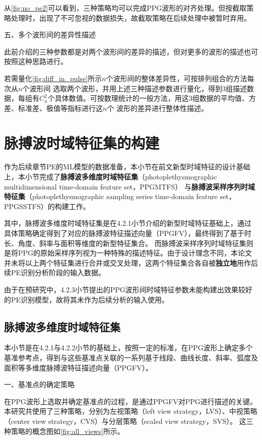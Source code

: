 从\autoref{fig:no_pe2}可以看到，三种策略均可以完成PPG波形的对齐处理。但按截取策略处理时，出现了不可忽视的数据损失，故截取策略在后续处理中被暂时弃用。

五、多个波形间的差异性描述

此前介绍的三种参数都是对两个波形间的差异的描述，但对更多的波形的描述也可按照这种思路进行。

若需量化\autoref{fig:diff_in_pulse}所示$n$个波形间的整体差异性，可按排列组合的方法每次从$n$个波形间
选取两个波形，并用上述三种描述参数进行量化，得到3组描述数据，每组有$C_n^2$个具体数值。可按数理统计的一般方法，用这3组数据的平均值、方差、标准差、极值等指标进行这$n$个
波形的差异进行整体性描述。

\section{脉搏波时域特征集的构建}
作为后续章节PE的ML模型的数据准备，本小节在前文新型时域特征的设计基础上，本小节完成了\textbf{脉搏波多维度时域特征集}（photoplethysmographic multidimensional time-domain feature set，PPGMTFS）
与\textbf{脉搏波采样序列时域特征集}（photoplethysmographic sampling series time-domain feature set，PPGSSTFS）的构建工作。

其中，脉搏波多维度时域特征集是在4.2.1小节介绍的新型时域特征基础上，通过具体策略确定得到了对应的脉搏波特征描述向量（PPGFV），最终得到了基于时长、角度、斜率与面积等维度的新型特征集合。
而脉搏波采样序列时域特征集则是将PPG的原始采样序列视为一种特殊的描述特征。由于设计理念不同，本论文并未将以上两个特征集进行合并或交叉处理，这两个特征集合各自被\textbf{独立地}用作后续PE识别分析阶段的输入数据。

由于在预研究中，4.2.3小节提出的PPG波形间时域特征参数未能构建出效果较好的PE识别模型，故将其未作为后续分析的输入使用。

\subsection{脉搏波多维度时域特征集}

本小节是在4.2.1与4.2.2小节的基础上，按照一定的标准，在PPG波形上确定多个基准参考点，得到与这些基准点关联的一系列基于线段、曲线长度、斜率、弧度及面积等多维度脉搏波特征描述向量（PPGFV）。

一、基准点的确定策略

在PPG波形上选取并确定基准点的过程，是通过PPGFV对PPG进行描述的关键。本研究共使用了三种策略，分别为左视策略（left view strategy，LVS）、中视策略（center view strategy，CVS）与分层策略（scaled view strategy，SVS）。
这三种策略的概念图如\autoref{fig:all_views}所示。

